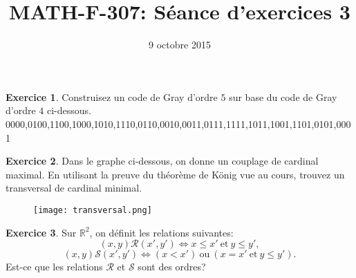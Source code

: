 \documentclass[11pt, a4paper]{article}
\begin{document}
 

\title{MATH-F-307: S\'eance d'exercices 3} 
\author{} 
\date{9 octobre 2015}

\theoremstyle{plain} 
\newtheorem*{theo}{Th\'eor\`eme}

\theoremstyle{definition} 
\newtheorem{exo}{Exercice}

\newcommand{\R}{\mathbb{R}} 
\newcommand{\Z}{\mathbb{Z}} 
\newcommand{\N}{\mathbb{N}} 

\renewcommand{\FrenchLabelItem}{\textbullet}

\maketitle

\vspace*{1cm}

\begin{exo}
Construisez un code de Gray d'ordre $5$ sur base du code de Gray d'ordre $4$ ci-dessous.\\
0000,0100,1100,1000,1010,1110,0110,0010,0011,0111,1111,1011,1001,1101,0101,0001
\end{exo}

\vspace*{1cm}

\begin{exo}
Dans le graphe ci-dessous, on donne un couplage de cardinal maximal. En utilisant la preuve du th\'eor\`eme de K\"onig vue au cours, trouvez un transversal de cardinal minimal.
\begin{figure}[!h]
\begin{center}
\texttt{[image: transversal.png]} 
\end{center}
\end{figure}
\end{exo}

\begin{exo}
Sur $\R^2$, on d\'efinit les relations suivantes:
$$(x,y)\mathcal{R}(x',y') \Leftrightarrow x \leq x' \mathrm{~et~} y \leq y', $$
$$(x,y)\mathcal{S}(x',y') \Leftrightarrow (x < x') \mathrm{~ou~} (x = x' \mathrm{~et~} y \leq y').$$
Est-ce que les relations $\mathcal{R}$ et $\mathcal{S}$ sont des ordres?
\end{exo}
\end{document}
